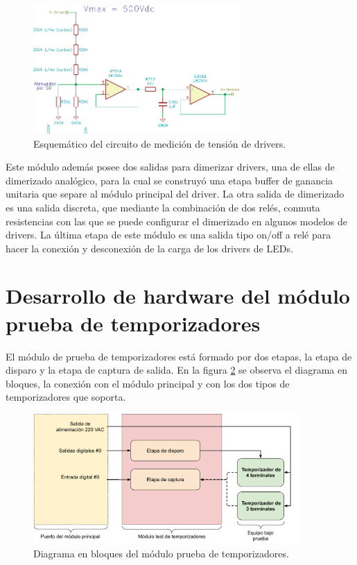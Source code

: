 \begin{figure}[H]
	\centering
	\includegraphics[width=0.7\textwidth]{./Figures/MedicionTension.pdf}
	\caption{Esquemático del circuito de medición de tensión de drivers.}
	\label{fig:MedicionTension}
\end{figure}

Este módulo además posee dos salidas para dimerizar drivers, una de ellas de dimerizado analógico, para la cual se construyó una etapa buffer de ganancia unitaria que separe al módulo principal del driver. La otra salida de dimerizado es una salida discreta, que mediante la combinación de dos relés, conmuta resistencias con las que se puede configurar el dimerizado en algunos modelos de drivers.
La última etapa de este módulo es una salida tipo on/off a relé para hacer la conexión y desconexión de la carga de los drivers de LEDs.


\section{Desarrollo de hardware del módulo prueba de temporizadores}

El módulo de prueba de temporizadores está formado por dos etapas, la etapa de disparo y la etapa de captura de salida. En la figura \ref{fig:BloquesTestTemp} se observa el diagrama en bloques, la conexión con el módulo principal y con los dos tipos de temporizadores que soporta.


\begin{figure}[H]
	\centering
	\includegraphics[width=0.9\textwidth]{./Figures/BloquesTestTemp.pdf}
	\caption{Diagrama en bloques del módulo prueba de temporizadores.}
	\label{fig:BloquesTestTemp}
\end{figure}


